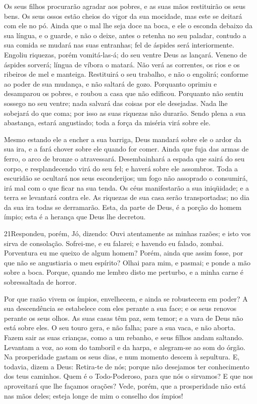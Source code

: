 Os seus filhos procurarão agradar aos pobres, e as suas mãos
restituirão os seus bens. Os seus ossos estão cheios do vigor
da sua mocidade, mas este se deitará com ele no pó. Ainda que
o mal lhe seja doce na boca, e ele o esconda debaixo da sua língua,
e o guarde, e não o deixe, antes o retenha no seu paladar,
contudo a sua comida se mudará nas suas entranhas; fel de
áspides será interiormente. Engoliu riquezas, porém
vomitá-las-á; do seu ventre Deus as lançará. Veneno de
áspides sorverá; língua de víbora o matará. Não verá as
correntes, os rios e os ribeiros de mel e manteiga.
Restituirá o seu trabalho, e não o engolirá; conforme ao
poder de sua mudança, e não saltará de gozo. Porquanto
oprimiu e desamparou os pobres, e roubou a casa que não edificou.
Porquanto não sentiu sossego no seu ventre; nada salvará das
coisas por ele desejadas. Nada lhe sobejará do que coma; por
isso as suas riquezas não durarão. Sendo plena a sua
abastança, estará angustiado; toda a força da miséria virá sobre
ele.

Mesmo estando ele a encher a sua barriga, Deus mandará sobre ele
o ardor da sua ira, e a fará chover sobre ele quando for comer.
Ainda que fuja das armas de ferro, o arco de bronze o
atravessará. Desembainhará a espada que sairá do seu corpo, e
resplandecendo virá do seu fel; e haverá sobre ele assombros.
Toda a escuridão se ocultará nos seus esconderijos; um fogo
não assoprado o consumirá, irá mal com o que ficar na sua tenda.
Os céus manifestarão a sua iniqüidade; e a terra se levantará
contra ele. As riquezas de sua casa serão transportadas; no
dia da sua ira todas se derramarão. Esta, da parte de Deus, é
a porção do homem ímpio; esta é a herança que Deus lhe decretou.

\medskip

\lettrine{21} Respondeu, porém, Jó, dizendo: Ouvi
atentamente as minhas razões; e isto vos sirva de consolação.
Sofrei-me, e eu falarei; e havendo eu falado, zombai.
Porventura eu me queixo de algum homem? Porém, ainda que assim
fosse, por que não se angustiaria o meu espírito? Olhai para
mim, e pasmai; e ponde a mão sobre a boca. Porque, quando me
lembro disto me perturbo, e a minha carne é sobressaltada de horror.

Por que razão vivem os ímpios, envelhecem, e ainda se robustecem
em poder? A sua descendência se estabelece com eles perante a
sua face; e os seus renovos perante os seus olhos. As suas casas
têm paz, sem temor; e a vara de Deus não está sobre eles. O
seu touro gera, e não falha; pare a sua vaca, e não aborta.
Fazem sair as suas crianças, como a um rebanho, e seus filhos
andam saltando. Levantam a voz, ao som do tamboril e da
harpa, e alegram-se ao som do órgão. Na prosperidade gastam
os seus dias, e num momento descem à sepultura. E, todavia,
dizem a Deus: Retira-te de nós; porque não desejamos ter
conhecimento dos teus caminhos. Quem é o Todo-Poderoso, para
que nós o sirvamos? E que nos aproveitará que lhe façamos orações?
Vede, porém, que a prosperidade não está nas mãos deles;
esteja longe de mim o conselho dos ímpios!

